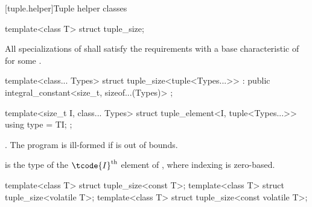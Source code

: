 [tuple.helper]{Tuple helper classes}

%
\begin{itemdecl}
template<class T> struct tuple_size;
\end{itemdecl}

\begin{itemdescr}
\pnum
\remarks All specializations of  shall satisfy the
 requirements with a
base characteristic of 
for some .
\end{itemdescr}

%
\begin{itemdecl}
template<class... Types>
  struct tuple_size<tuple<Types...>> : public integral_constant<size_t, sizeof...(Types)> { };
\end{itemdecl}

%
\begin{itemdecl}
template<size_t I, class... Types>
  struct tuple_element<I, tuple<Types...>> {
    using type = TI;
  };
\end{itemdecl}

\begin{itemdescr}
\pnum
\requires {}.
The program is ill-formed if  is out of bounds.

\pnum
\ctype {} is the
type of the $\tcode{I}^\text{th}$ element of ,
where indexing is zero-based.
\end{itemdescr}

%
\begin{itemdecl}
template<class T> struct tuple_size<const T>;
template<class T> struct tuple_size<volatile T>;
template<class T> struct tuple_size<const volatile T>;
\end{itemdecl}

